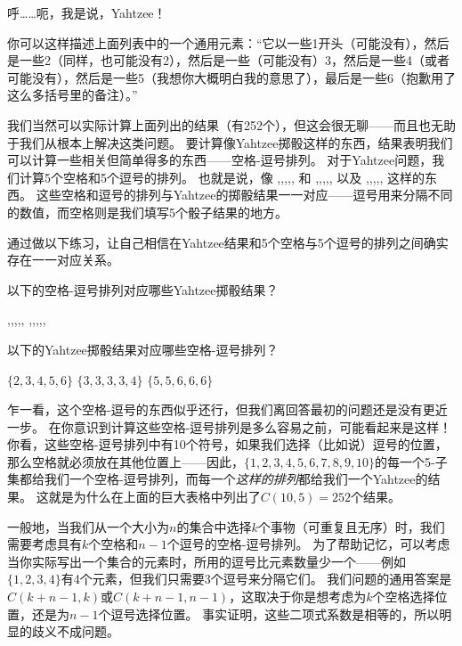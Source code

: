 呼……呃，我是说，Yahtzee！

你可以这样描述上面列表中的一个通用元素：“它以一些1开头（可能没有），然后是一些2（同样，也可能没有2），然后是一些（可能没有）3，然后是一些4（或者可能没有），然后是一些5（我想你大概明白我的意思了），最后是一些6（抱歉用了这么多括号里的备注）。”

我们当然可以实际计算上面列出的结果（有252个），但这会很无聊——而且也无助于我们从根本上解决这类问题。
要计算像Yahtzee掷骰这样的东西，结果表明我们可以计算一些相关但简单得多的东西——空格-逗号排列。
对于Yahtzee问题，我们计算5个空格和5个逗号的排列。
也就是说，像 {\LARGE \blnk\blnk,\blnk,,\blnk,\blnk,} 和 {\LARGE \blnk\blnk\blnk\blnk\blnk,,,,,} 以及 {\LARGE ,,,\blnk\blnk\blnk\blnk\blnk,,} 这样的东西。
这些空格和逗号的排列与Yahtzee的掷骰结果一一对应——逗号用来分隔不同的数值，而空格则是我们填写5个骰子结果的地方。

通过做以下练习，让自己相信在Yahtzee结果和5个空格与5个逗号的排列之间确实存在一一对应关系。

\begin{exer}
以下的空格-逗号排列对应哪些Yahtzee掷骰结果？

\noindent {\LARGE \blnk,\blnk,\blnk,\blnk,\blnk,} \hspace{\fill} {\LARGE \blnk\blnk,\blnk\blnk\blnk,,,,}  \hspace{\fill} {\LARGE ,,,,,\blnk\blnk\blnk\blnk\blnk}
\medskip

以下的Yahtzee掷骰结果对应哪些空格-逗号排列？

\noindent $\{2,3,4,5,6\}$  \hspace{\fill} $\{3,3,3,3,4\}$  \hspace{\fill} $\{5,5,6,6,6\}$
\end{exer}

乍一看，这个空格-逗号的东西似乎还行，但我们离回答最初的问题还是没有更近一步。
在你意识到计算这些空格-逗号排列是多么容易之前，可能看起来是这样！
你看，这些空格-逗号排列中有10个符号，如果我们选择（比如说）逗号的位置，那么空格就必须放在其他位置上——因此，$\{1,2,3,4,5,6,7,8,9,10\}$的每一个5-子集都给我们一个空格-逗号排列，而每一个\emph{这样的排列}都给我们一个Yahtzee的结果。
这就是为什么在上面的巨大表格中列出了$C(10, 5) = 252$个结果。

一般地，当我们从一个大小为$n$的集合中选择$k$个事物（可重复且无序）时，我们需要考虑具有$k$个空格和$n-1$个逗号的空格-逗号排列。
为了帮助记忆，可以考虑当你实际写出一个集合的元素时，所用的逗号比元素数量少一个——例如$\{1,2,3,4\}$有4个元素，但我们只需要3个逗号来分隔它们。
我们问题的通用答案是$C(k+n-1,k)$或$C(k+n-1, n-1)$，这取决于你是想考虑为$k$个空格选择位置，还是为$n-1$个逗号选择位置。
事实证明，这些二项式系数是相等的，所以明显的歧义不成问题。

